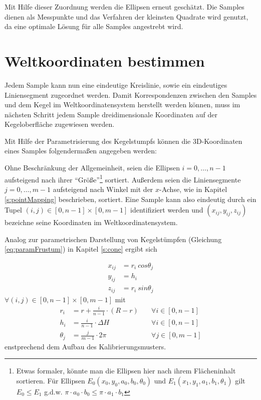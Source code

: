 Mit Hilfe dieser Zuordnung werden die Ellipsen erneut geschätzt. Die Samples dienen als Messpunkte und das Verfahren der kleinsten Quadrate wird genutzt, da eine optimale Lösung für alle Samples angestrebt wird.

\section{Weltkoordinaten bestimmen}
Jedem Sample kann nun eine eindeutige Kreislinie, sowie ein eindeutiges Liniensegment zugeordnet werden. Damit Korrespondenzen zwischen den Samples und dem Kegel im Weltkoordinatensystem herstellt werden können, muss im nächsten Schritt jedem Sample dreidimensionale Koordinaten auf der Kegeloberfläche zugewiesen werden.

Mit Hilfe der Parametrisierung des Kegelstumpfs können die 3D-Koordinaten eines Samples folgendermaßen angegeben werden:

Ohne Beschränkung der Allgemeinheit, seien die Ellipsen $i = 0,\dotsc,n - 1$ aufsteigend nach ihrer "`Größe"'\footnote{Etwas formaler, könnte man die Ellipsen hier nach ihrem Flächeninhalt sortieren. Für Ellipsen $E_0(x_0,y_0,a_0, b_0, \theta_0)$ und $E_1(x_1,y_1,a_1, b_1,\theta_1)$ gilt $E_0 \leq E_1$ g.d.w. $\pi\cdot a_0 \cdot b_0 \leq \pi \cdot a_1 \cdot b_1$} sortiert.
Außerdem seien die Liniensegmente $j = 0,\dotsc,m - 1$ aufsteigend nach Winkel mit der $x$-Achse, wie in Kapitel \ref{s:pointMapping} beschrieben, sortiert.
Eine Sample kann also eindeutig durch ein Tupel $(i,j) \in [0,n-1]\times [0,m-1]$ identifiziert werden und $(x_{ij},y_{ij},z_{ij})$ bezeichne seine Koordinaten im Weltkoordinatensystem.

Analog zur parametrischen Darstellung von Kegelstümpfen (Gleichung \ref{eq:paramFrustum}) in Kapitel \ref{s:cone} ergibt sich

\[
\begin{aligned}
x_{ij} &= r_i~cos \theta_j \\
y_{ij} &= h_i\\
z_{ij} &= r_i~sin \theta_j
\end{aligned}
\]
$\forall (i,j) \in [0,n-1]\times [0,m-1]$ mit
\[
\begin{aligned}
r_i &= r + \frac{i}{n - 1}\cdot(R - r) \quad&\forall i\in[0,n-1]\\
h_i &= \frac{i}{n - 1}\cdot\Delta H &\forall i\in[0,n-1]\\
\theta_j &= \frac{j}{m-1} \cdot  2\pi  &\forall j\in[0,m-1]
\end{aligned}
\] %
enstprechend dem Aufbau des Kalibrierungsmusters.



